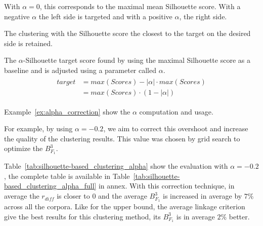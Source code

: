 With $\alpha = 0$, this corresponds to the maximal mean Silhouette score.
With a negative $\alpha$ the left side is targeted and with a positive $\alpha$, the right side.

The clustering with the Silhouette score the closest to the target on the desired side is retained.

\begin{definition}
  The $\alpha$-Silhouette target score found by using the maximal Silhouette score as a baseline and is adjusted using a parameter called $\alpha$.
  \begin{gather*}
    \begin{aligned}
    target &= max(Scores) - |\alpha| \cdot max(Scores) \\
           &= max(Scores) \cdot (1 - |\alpha|)
    \end{aligned}
  \end{gather*}
\end{definition}

Example~\ref{ex:alpha_correction} show the $\alpha$ computation and usage.

For example, by using $\alpha = -0.2$, we aim to correct this overshoot and increase the quality of the clustering results.
This value was chosen by grid search to optimize the $B^3_{F_1}$.

Table~\ref{tab:silhouette-based_clustering_alpha} show the evaluation with $\alpha = -0.2$, the complete table is available in Table~\ref{tab:silhouette-based_clustering_alpha_full} in annex.
With this correction technique, in average the $r_{diff}$ is closer to 0 and the average $B^3_{F_1}$ is increased in average by $7\%$ across all the corpora.
Like for the upper bound, the average linkage criterion give the best results for this clustering method, its $B^3_{F_1}$ is in average $2\%$ better.

